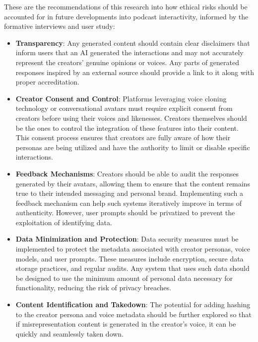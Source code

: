 \documentclass[12pt]{report}
\begin{document}
\begin{myfont}
        \indent These are the recommendations of this research into how ethical risks should be accounted for in future developments into podcast interactivity, informed by the formative interviews and user study:
        
        \begin{itemize}
            \item \textbf{Transparency}: Any generated content should contain clear disclaimers that inform users that an AI generated the interactions and may not accurately represent the creators' genuine opinions or voices. Any parts of generated responses inspired by an external source should provide a link to it along with proper accreditation. 
            \item \textbf{Creator Consent and Control}: Platforms leveraging voice cloning technology or conversational avatars must require explicit consent from creators before using their voices and likenesses. Creators themselves should be the ones to control the integration of these features into their content. This consent process ensures that creators are fully aware of how their personas are being utilized and have the authority to limit or disable specific interactions.
            \item \textbf{Feedback Mechanisms}: Creators should be able to audit the responses generated by their avatars, allowing them to ensure that the content remains true to their intended messaging and personal brand. Implementing such a feedback mechanism can help such systems iteratively improve in terms of authenticity. However, user prompts should be privatized to prevent the exploitation of identifying data. 
            \item \textbf{Data Minimization and Protection}: Data security measures must be implemented to protect the metadata associated with creator personas, voice models, and user prompts. These measures include encryption, secure data storage practices, and regular audits. Any system that uses such data should be designed to use the minimum amount of personal data necessary for functionality, reducing the risk of privacy breaches.
            \item \textbf{Content Identification and Takedown}: The potential for adding hashing to the creator persona and voice metadata should be further explored so that if misrepresentation content is generated in the creator's voice, it can be quickly and seamlessly taken down.
        \end{itemize}


\end{myfont}
\end{document}
